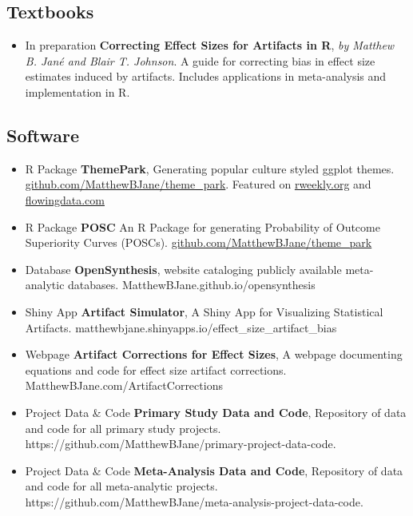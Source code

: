 \documentclass[
  letterpaper,
  DIV=11,
  numbers=noendperiod]{scrartcl}
\providecommand{\tightlist}{%
  \setlength{\itemsep}{0pt}\setlength{\parskip}{0pt}}\usepackage{longtable,booktabs,array}
\begin{document}
\hypertarget{textbooks}{%
\subsection{\texorpdfstring{ Textbooks}{ Textbooks}}\label{textbooks}}

\begin{itemize}
\tightlist
\item
  In preparation \textbar{} \textbf{Correcting Effect Sizes for
  Artifacts in R}, \emph{by Matthew B. Jané and Blair T. Johnson}. A
  guide for correcting bias in effect size estimates induced by
  artifacts. Includes applications in meta-analysis and implementation
  in R.
\end{itemize}

\hypertarget{software}{%
\subsection{\texorpdfstring{ Software}{ Software}}\label{software}}

\begin{itemize}
\item
  { R Package } \textbf{ThemePark}, Generating popular culture styled
  ggplot themes.
  \href{https://github.com/MatthewBJane/theme_park}{github.com/MatthewBJane/theme\_park}.
  Featured on \href{https://rweekly.org/2023-W32.html}{rweekly.org} and
  \href{https://flowingdata.com/2023/07/28/barbie-and-oppenheimer-themes-for-charts-in-r/}{flowingdata.com}
\item
  { R Package } \textbf{POSC} An R Package for generating Probability of
  Outcome Superiority Curves (POSCs).
  \href{https://github.com/MatthewBJane/theme_park}{github.com/MatthewBJane/theme\_park}
\item
  { Database } \textbf{OpenSynthesis}, website cataloging publicly
  available meta-analytic databases.
  MatthewBJane.github.io/opensynthesis
\item
  { Shiny App } \textbf{Artifact Simulator}, A Shiny App for Visualizing
  Statistical Artifacts.
  matthewbjane.shinyapps.io/effect\_size\_artifact\_bias
\item
  { Webpage } \textbf{Artifact Corrections for Effect Sizes}, A webpage
  documenting equations and code for effect size artifact corrections.
  MatthewBJane.com/ArtifactCorrections
\item
  { Project Data \& Code } \textbf{Primary Study Data and Code},
  Repository of data and code for all primary study projects.
  https://github.com/MatthewBJane/primary-project-data-code.
\item
  { Project Data \& Code } \textbf{Meta-Analysis Data and Code},
  Repository of data and code for all meta-analytic projects.
  https://github.com/MatthewBJane/meta-analysis-project-data-code.
\end{itemize}
\end{document}
